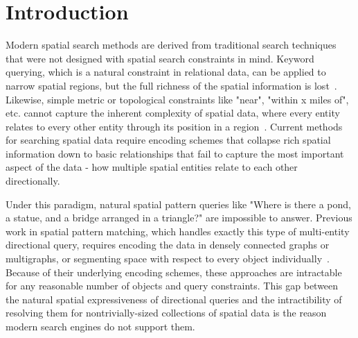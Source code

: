 \section{Introduction}

\label{section:introduction}

Modern spatial search methods are derived from traditional search techniques that were not designed with spatial search constraints in mind.
Keyword querying, which is a natural constraint in relational data, can be applied to narrow spatial regions, but the full richness of the spatial information is lost~\cite{Guo2015, Cao2012, Zhang2009, Osul2023}.
Likewise, simple metric or topological constraints like "near", "within x miles of", etc. cannot capture the inherent complexity of spatial data, where every entity relates to every other entity through its position in a region~\cite{Carniel2020,Bertella2022,Carniel2023}. 
Current methods for searching spatial data require encoding schemes that collapse rich spatial information down to basic relationships that fail to capture the most important aspect of the data - how multiple spatial entities relate to each other directionally.

Under this paradigm, natural spatial pattern queries like "Where is there a pond, a statue, and a bridge arranged in a triangle?" are impossible to answer.
Previous work in spatial pattern matching, which handles exactly this type of multi-entity directional query, requires encoding the data in densely connected graphs or multigraphs, or segmenting space with respect to every object individually~\cite{Folkers2000, Fang2019,Chen2019,Fang2019}.
Because of their underlying encoding schemes, these approaches are intractable for any reasonable number of objects and query constraints.
This gap between the natural spatial expressiveness of directional queries and the intractibility of resolving them for nontrivially-sized collections of spatial data is the reason modern search engines do not support them.


